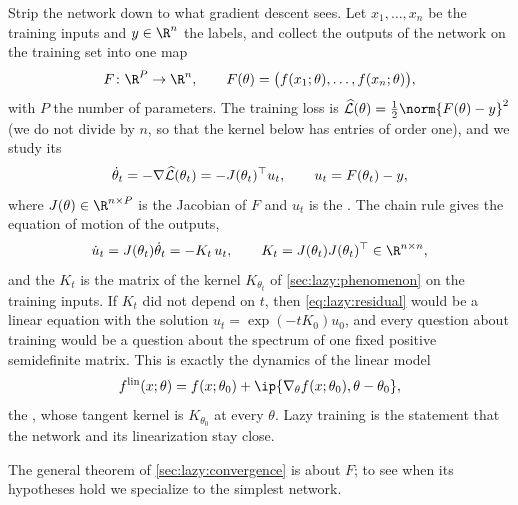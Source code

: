 \begin{refsection}
Strip the network down to what gradient descent sees. Let $x_1,\dots,x_n$ be the training inputs and $y\in\R^n$ the labels, and collect the outputs of the network on the training set into one map
\[
  F\colon\R^P\to\R^n,\qquad F(\theta)=\bigl(f(x_1;\theta),\dots,f(x_n;\theta)\bigr),
\]
with $P$ the number of parameters. The training loss is $\Lhat(\theta)=\frac12\norm{F(\theta)-y}^2$ (we do not divide by $n$, so that the kernel below has entries of order one), and we study its 
\begin{equation}\label{eq:lazy:flow}
  \dot\theta_t=-\nabla\widehat{\mathcal{L}}(\theta_t)=-J(\theta_t)^\top u_t,\qquad u_t=F(\theta_t)-y ,
\end{equation}
where $J(\theta)\in\R^{n\times P}$ is the Jacobian of $F$ and $u_t$ is the . The chain rule gives the equation of motion of the outputs,
\begin{equation}\label{eq:lazy:residual}
  \dot u_t=J(\theta_t)\dot\theta_t=-K_t\,u_t,\qquad K_t=J(\theta_t)J(\theta_t)^\top\in\R^{n\times n},
\end{equation}
and the  $K_t$ is the matrix of the kernel $K_{\theta_t}$ of \cref{sec:lazy:phenomenon} on the training inputs. If $K_t$ did not depend on $t$, then \eqref{eq:lazy:residual} would be a linear equation with the solution $u_t=\exp(-tK_0)u_0$, and every question about training would be a question about the spectrum of one fixed positive semidefinite matrix. This is exactly the dynamics of the linear model
\begin{equation}\label{eq:lazy:lin}
  f^{\mathrm{lin}}(x;\theta)=f(x;\theta_0)+\ip{\nabla_\theta f(x;\theta_0),\theta-\theta_0},
\end{equation}
the , whose tangent kernel is $K_{\theta_0}$ at every $\theta$. Lazy training is the statement that the network and its linearization stay close.

The general theorem of \cref{sec:lazy:convergence} is about $F$; to see when its hypotheses hold we specialize to the simplest network.



\end{refsection}
